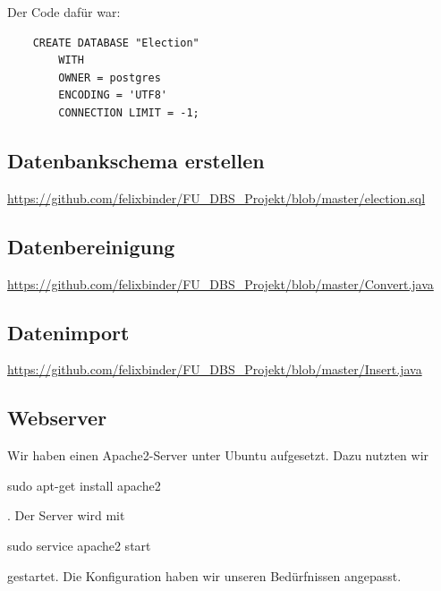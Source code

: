 \documentclass[BCOR0mm,fontsize=12pt,paper=a4,final,numbers=noenddot]{scrartcl}
\begin{document}
Der Code dafür war:
\begin{verbatim}
	CREATE DATABASE "Election"
	    WITH 
	    OWNER = postgres
	    ENCODING = 'UTF8'
	    CONNECTION LIMIT = -1;
\end{verbatim}

\subsection{Datenbankschema erstellen}
\url{https://github.com/felixbinder/FU_DBS_Projekt/blob/master/election.sql}

\subsection{Datenbereinigung}
\url{https://github.com/felixbinder/FU_DBS_Projekt/blob/master/Convert.java}

\subsection{Datenimport}
\url{https://github.com/felixbinder/FU_DBS_Projekt/blob/master/Insert.java}

\subsection{Webserver}
Wir haben einen Apache2-Server unter Ubuntu aufgesetzt. Dazu nutzten wir \begin{sffamily}sudo apt-get install apache2\end{sffamily}. Der Server wird mit \begin{sffamily}sudo service apache2 start\end{sffamily} gestartet. Die Konfiguration haben wir unseren Bedürfnissen angepasst.
\end{document}
